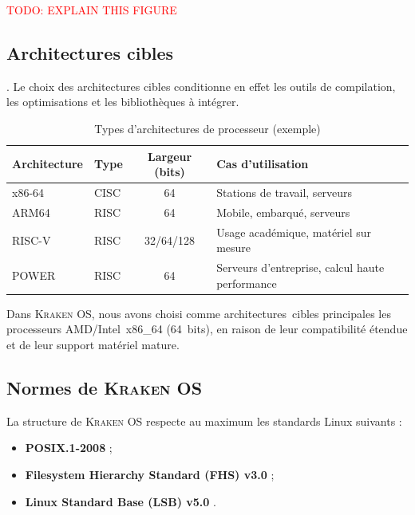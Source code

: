 \label{sec:arch-generale}

\textcolor{red}{TODO: EXPLAIN THIS FIGURE}
\subsection{Architectures cibles}
\label{subsec:arch-cibles}

. Le choix des architectures cibles conditionne en effet les outils de compilation, les optimisations et les bibliothèques à intégrer.

\begin{table}[htbp]
  \centering
  \caption{Types d’architectures de processeur (exemple)}
  \label{tab:architectures}
  \begin{tabular}{|l| l| c| l|}
    \toprule
    \textbf{Architecture} & \textbf{Type} & \textbf{Largeur (bits)} & \textbf{Cas d'utilisation} \\
    \midrule
    x86-64   & CISC & 64           & Stations de travail, serveurs \\
    ARM64    & RISC & 64           & Mobile, embarqué, serveurs    \\
    RISC-V   & RISC & 32/64/128    & Usage académique, matériel sur mesure \\
    POWER    & RISC & 64           & Serveurs d'entreprise, calcul haute performance \\
    \bottomrule
  \end{tabular}
\end{table}

Dans \textsc{Kraken OS}, nous avons choisi comme architectures cibles principales les processeurs AMD/Intel x86\_64 (64 bits), en raison de leur compatibilité étendue et de leur support matériel mature.


\subsection{Normes de \textsc{Kraken OS}}
\label{subsec:standards}

La structure de \textsc{Kraken OS} respecte au maximum les standards Linux suivants :

\begin{itemize}
  \item \textbf{POSIX.1-2008}  ;
  \item \textbf{Filesystem Hierarchy Standard (FHS) v3.0} ;
  \item \textbf{Linux Standard Base (LSB) v5.0 }.
\end{itemize}



